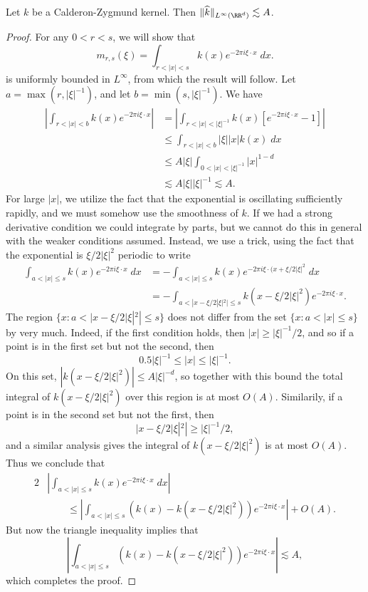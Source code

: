 \begin{lemma}
    Let $k$ be a Calderon-Zygmund kernel. Then $\| \widehat{k} \|_{L^\infty(\RR^d)} \lesssim A$.
\end{lemma}
\begin{proof}
    For any $0 < r < s$, we will show that
    \[ m_{r,s}(\xi) = \int_{r < |x| < s} k(x) e^{-2 \pi i \xi \cdot x}\; dx. \]
    is uniformly bounded in $L^\infty$, from which the result will follow. Let $a = \max(r,|\xi|^{-1})$, and let $b = \min(s,|\xi|^{-1})$. We have
    \begin{align*}
        \left| \int_{r < |x| < b} k(x) e^{-2 \pi i \xi \cdot x} \right| &= \left| \int_{r < |x| < |\xi|^{-1}} k(x) [e^{-2 \pi i \xi \cdot x} - 1] \right|\\
        &\leq \int_{r < |x| < b} |\xi| |x| k(x)\; dx\\
        &\leq A |\xi| \int_{0 < |x| < |\xi|^{-1}} |x|^{1-d}\\
        &\lesssim A |\xi| |\xi|^{-1} \lesssim A.
    \end{align*}
    For large $|x|$, we utilize the fact that the exponential is oscillating sufficiently rapidly, and we must somehow use the smoothness of $k$. If we had a strong derivative condition we could integrate by parts, but we cannot do this in general with the weaker conditions assumed. Instead, we use a trick, using the fact that the exponential is $\xi/2 |\xi|^2$ periodic to write
    \begin{align*}
        \int_{a < |x| \leq s} k(x) e^{-2 \pi i \xi \cdot x}\; dx &= - \int_{a < |x| \leq s} k(x) e^{-2 \pi i \xi \cdot (x + \xi / 2 |\xi|^2}\; dx\\
        &= - \int_{a < |x - \xi / 2 |\xi|^2| \leq s} k(x - \xi / 2 |\xi|^2) e^{-2 \pi i \xi \cdot x}.
    \end{align*}
    The region $\{ x : a < |x - \xi / 2 |\xi|^2 | \leq s \}$ does not differ from the set $\{ x : a < |x| \leq s \}$ by very much. Indeed, if the first condition holds, then $|x| \geq |\xi|^{-1} / 2$, and so if a point is in the first set but not the second, then
    \[ 0.5 |\xi|^{-1} \leq |x| \leq |\xi|^{-1}. \]
    On this set, $|k(x - \xi / 2 |\xi|^2)| \leq A |\xi|^{-d}$, so together with this bound the total integral of $k(x - \xi / 2 |\xi|^2)$ over this region is at most $O(A)$. Similarily, if a point is in the second set but not the first, then
    \[ |x - \xi / 2 |\xi|^2| \geq |\xi|^{-1}/2, \]
    and a similar analysis gives the integral of $k(x - \xi / 2|\xi|^2)$ is at most $O(A)$. Thus we conclude that
    \begin{align*}
        2& \left| \int_{a < |x| \leq s} k(x) e^{-2 \pi i \xi \cdot x}\; dx \right|\\
        &\quad\quad \leq \left| \int_{a < |x| \leq s} (k(x) - k(x - \xi / 2 |\xi|^2)) e^{-2 \pi i \xi \cdot x} \right| + O(A).
    \end{align*}
    But now the triangle inequality implies that
    \[ \left| \int_{a < |x| \leq s} (k(x) - k(x - \xi / 2 |\xi|^2)) e^{-2 \pi i \xi \cdot x} \right| \lesssim A, \]
    which completes the proof.
\end{proof}

